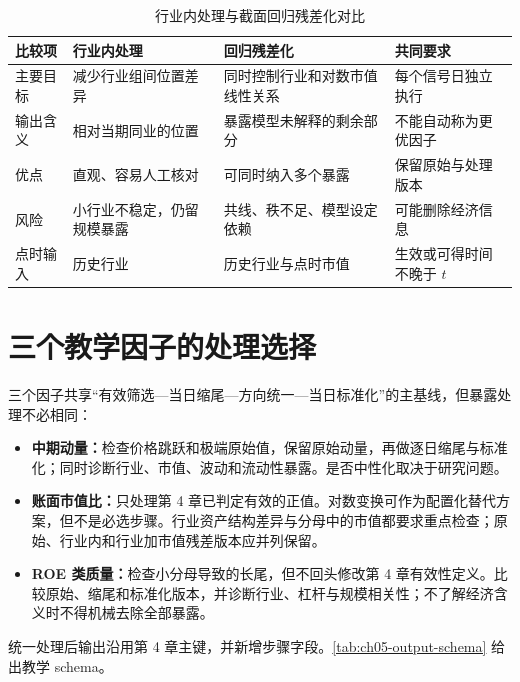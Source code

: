 \begin{table}[htbp]
  \centering
  \small
  \caption{行业内处理与截面回归残差化对比}
  \label{tab:ch05-exposure-methods}
  \begin{tabularx}{\textwidth}{p{2.7cm} Y Y Y}
    \toprule
    比较项 & 行业内处理 & 回归残差化 & 共同要求 \\
    \midrule
    主要目标 & 减少行业组间位置差异 & 同时控制行业和对数市值线性关系 & 每个信号日独立执行 \\
    输出含义 & 相对当期同业的位置 & 暴露模型未解释的剩余部分 & 不能自动称为更优因子 \\
    优点 & 直观、容易人工核对 & 可同时纳入多个暴露 & 保留原始与处理版本 \\
    风险 & 小行业不稳定，仍留规模暴露 & 共线、秩不足、模型设定依赖 & 可能删除经济信息 \\
    点时输入 & 历史行业 & 历史行业与点时市值 & 生效或可得时间不晚于 \(t\) \\
    \bottomrule
  \end{tabularx}
\end{table}

\section{三个教学因子的处理选择}

三个因子共享“有效筛选—当日缩尾—方向统一—当日标准化”的主基线，但暴露处理不必相同：

\begin{itemize}
  \item \textbf{中期动量：}检查价格跳跃和极端原始值，保留原始动量，再做逐日缩尾与标准化；同时诊断行业、市值、波动和流动性暴露。是否中性化取决于研究问题。
  \item \textbf{账面市值比：}只处理第 4 章已判定有效的正值。对数变换可作为配置化替代方案，但不是必选步骤。行业资产结构差异与分母中的市值都要求重点检查；原始、行业内和行业加市值残差版本应并列保留。
  \item \textbf{ROE 类质量：}检查小分母导致的长尾，但不回头修改第 4 章有效性定义。比较原始、缩尾和标准化版本，并诊断行业、杠杆与规模相关性；不了解经济含义时不得机械去除全部暴露。
\end{itemize}

统一处理后输出沿用第 4 章主键，并新增步骤字段。\cref{tab:ch05-output-schema} 给出教学 schema。

